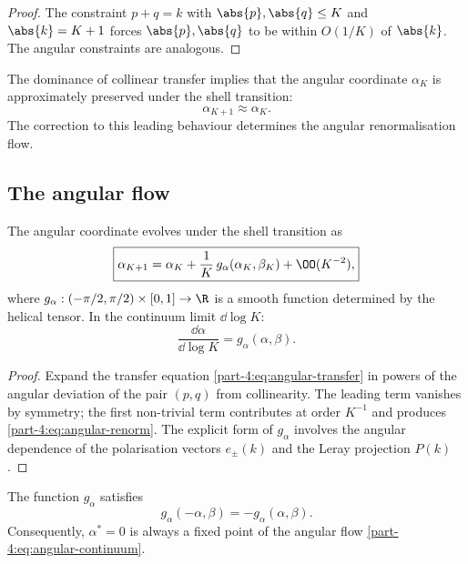 \begin{proof}
The constraint $p+q=k$ with $\abs{p},\abs{q}\leq K$ and $\abs{k}=K+1$ 
forces $\abs{p},\abs{q}$ to be within $O(1/K)$ of $\abs{k}$. The 
angular constraints are analogous.
\end{proof}

The dominance of collinear transfer implies that the angular 
coordinate $\alpha_K$ is approximately preserved under the shell 
transition:
\begin{equation}\label{part-4:eq:alpha-preserved}
\alpha_{K+1} \approx \alpha_K.
\end{equation}
The correction to this leading behaviour determines the angular 
renormalisation flow.

\subsection{The angular flow}
\label{part-4:ssec:angular-flow}

\begin{theorem}\label{part-4:thm:angular-renorm}
The angular coordinate evolves under the shell transition as
\begin{equation}\label{part-4:eq:angular-renorm}
\boxed{
\alpha_{K+1} = \alpha_K + \frac{1}{K}\,g_\alpha(\alpha_K,\beta_K) + 
\OO(K^{-2}),
}
\end{equation}
where $g_\alpha:(-\pi/2,\pi/2)\times[0,1]\to\R$ is a smooth function 
determined by the helical tensor. In the continuum limit 
$\dd\log K$:
\begin{equation}\label{part-4:eq:angular-continuum}
\frac{\dd\alpha}{\dd\log K} = g_\alpha(\alpha,\beta).
\end{equation}
\end{theorem}

\begin{proof}
Expand the transfer equation \eqref{part-4:eq:angular-transfer} in powers 
of the angular deviation of the pair $(p,q)$ from collinearity. The 
leading term vanishes by symmetry; the first non-trivial term 
contributes at order $K^{-1}$ and produces \eqref{part-4:eq:angular-renorm}. 
The explicit form of $g_\alpha$ involves the angular dependence of 
the polarisation vectors $e_\pm(k)$ and the Leray projection 
$P(k)$.
\end{proof}

\begin{proposition}\label{part-4:prop:angular-sym}
The function $g_\alpha$ satisfies
\begin{equation}\label{part-4:eq:g-sym}
g_\alpha(-\alpha,\beta) = -g_\alpha(\alpha,\beta).
\end{equation}
Consequently, $\alpha^\ast = 0$ is always a fixed point of the 
angular flow \eqref{part-4:eq:angular-continuum}.
\end{proposition}

